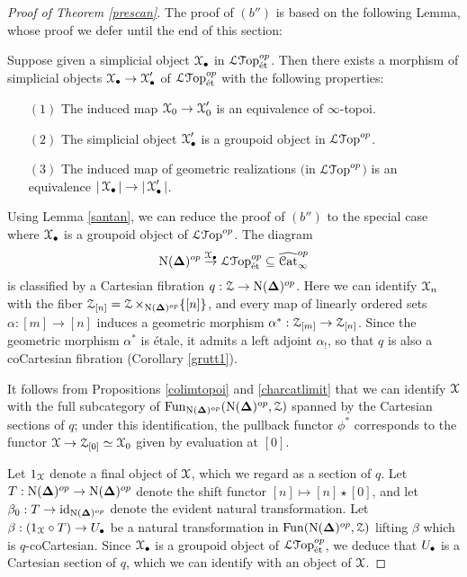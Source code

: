 \begin{proof}[Proof of Theorem \ref{prescan}]
The proof of $(b'')$ is based on the following Lemma, whose proof we defer until the end of this section:

\begin{lemma}\label{santan}
Suppose given a simplicial object $\operatorname{\mathcal{X}}_{\bullet}$ in $\operatorname{\mathcal{L}{\mathcal T}op}^{op}_{\text{\'{e}t}}$. Then
there exists a morphism of simplicial objects $\operatorname{\mathcal{X}}_{\bullet} \rightarrow \operatorname{\mathcal{X}}'_{\bullet}$
of $\operatorname{\mathcal{L}{\mathcal T}op}^{op}_{\text{\'{e}t}}$ with the following properties:
\begin{itemize}
\item[$(1)$] The induced map $\operatorname{\mathcal{X}}_0 \rightarrow \operatorname{\mathcal{X}}'_0$ is an equivalence of $\infty$-topoi.
\item[$(2)$] The simplicial object $\operatorname{\mathcal{X}}'_{\bullet}$ is a groupoid object in $\operatorname{\mathcal{L}{\mathcal T}op}^{op}$.
\item[$(3)$] The induced map of geometric realizations $($in $\operatorname{\mathcal{L}{\mathcal T}op}^{op}${}$)$ is an equivalence
$| \operatorname{\mathcal{X}}_{\bullet} | \rightarrow | \operatorname{\mathcal{X}}'_{\bullet} |$.
\end{itemize}
\end{lemma}

Using Lemma \ref{santan}, we can reduce the proof of $(b'')$ to the special case where
$\operatorname{\mathcal{X}}_{\bullet}$ is a groupoid object of $\operatorname{\mathcal{L}{\mathcal T}op}^{op}$. The diagram
$$ \operatorname{N}( \operatorname{{\bf \Delta}} )^{op} \stackrel{\operatorname{\mathcal{X}}_{\bullet}}{\rightarrow} \operatorname{\mathcal{L}{\mathcal T}op}^{op}_{\text{\'{e}t}} 
\subseteq \widehat{\operatorname{\mathcal{C}at}}_{\infty}^{op}$$
is classified by a Cartesian fibration $q: \operatorname{\mathcal{Z}} \rightarrow \operatorname{N}( \operatorname{{\bf \Delta}})^{op}$.
Here we can identify $\operatorname{\mathcal{X}}_{n}$ with the fiber $\operatorname{\mathcal{Z}}_{[n]} = \operatorname{\mathcal{Z}} \times_{ \operatorname{N}(\operatorname{{\bf \Delta}})^{op} } \{ [n] \}$, and every map of linearly ordered sets $\alpha: [m] \rightarrow [n]$ induces a geometric morphism $\alpha^{\ast}: \operatorname{\mathcal{Z}}_{[m]} \rightarrow \operatorname{\mathcal{Z}}_{[n]}$. Since the geometric morphism $\alpha^{\ast}$ is \'{e}tale, it admits a left adjoint $\alpha_{!}$, so that $q$ is also a coCartesian fibration (Corollary \ref{grutt1}).

It follows from Propositions \ref{colimtopoi} and \ref{charcatlimit} that we can identify
$\operatorname{\mathcal{X}}$ with the full subcategory of $\operatorname{Fun}_{ \operatorname{N}(\operatorname{{\bf \Delta}})^{op} } ( \operatorname{N}(\operatorname{{\bf \Delta}})^{op}, \operatorname{\mathcal{Z}})$ spanned by the Cartesian sections of $q$; under this identification, the pullback functor
$\phi^{\ast}$ corresponds to the functor $\operatorname{\mathcal{X}} \rightarrow \operatorname{\mathcal{Z}}_{[0]} \simeq \operatorname{\mathcal{X}}_0$ given by evaluation at $[0]$. 

Let $1_{\operatorname{\mathcal{X}}}$ denote a final object of $\operatorname{\mathcal{X}}$, which we regard as a section of $q$. 
Let $T: \operatorname{N}(\operatorname{{\bf \Delta}})^{op} \rightarrow \operatorname{N}(\operatorname{{\bf \Delta}})^{op}$ denote the shift functor
$[n] \mapsto [n] \star [0]$, and let $\beta_0: T \rightarrow \operatorname{id}_{ \operatorname{N}(\operatorname{{\bf \Delta}})^{op} }$ denote the evident natural transformation. Let $\beta: (1_{\operatorname{\mathcal{X}}} \circ T) \rightarrow U_{\bullet}$ be a
natural transformation in $\operatorname{Fun}( \operatorname{N}(\operatorname{{\bf \Delta}})^{op}, \operatorname{\mathcal{Z}})$ lifting $\beta$ which is
$q$-coCartesian. Since $\operatorname{\mathcal{X}}_{\bullet}$ is a groupoid object of $\operatorname{\mathcal{L}{\mathcal T}op}^{op}_{\text{\'{e}t}}$, we deduce that $U_{\bullet}$ is a Cartesian section of $q$, which we can identify with an object of
$\operatorname{\mathcal{X}}$.


\end{proof}
